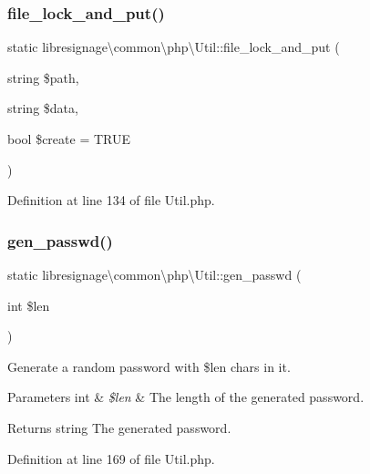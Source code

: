 \subsubsection{\texorpdfstring{file\+\_\+lock\+\_\+and\+\_\+put()}{file\_lock\_and\_put()}}
{\footnotesize\ttfamily static libresignage\textbackslash{}common\textbackslash{}php\textbackslash{}\+Util\+::file\+\_\+lock\+\_\+and\+\_\+put (\begin{DoxyParamCaption}\item[{string}]{\$path,  }\item[{string}]{\$data,  }\item[{bool}]{\$create = {\ttfamily TRUE} }\end{DoxyParamCaption})\hspace{0.3cm}{\ttfamily [static]}}



Definition at line 134 of file Util.\+php.

\mbox{\label{classlibresignage_1_1common_1_1php_1_1Util_ab8c8392529cfcfb2a143880c5d91f3bb}} 
\subsubsection{\texorpdfstring{gen\+\_\+passwd()}{gen\_passwd()}}
{\footnotesize\ttfamily static libresignage\textbackslash{}common\textbackslash{}php\textbackslash{}\+Util\+::gen\+\_\+passwd (\begin{DoxyParamCaption}\item[{int}]{\$len }\end{DoxyParamCaption})\hspace{0.3cm}{\ttfamily [static]}}

Generate a random password with \$len chars in it.


\begin{DoxyParams}[1]{Parameters}
int & {\em \$len} & The length of the generated password.\\
\hline
\end{DoxyParams}
\begin{DoxyReturn}{Returns}
string The generated password. 
\end{DoxyReturn}


Definition at line 169 of file Util.\+php.

